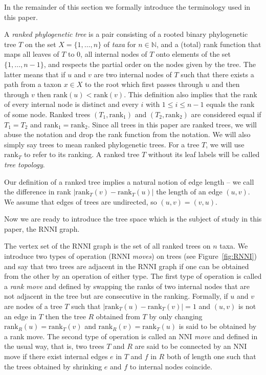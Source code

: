 \documentclass{amsart}
\newcommand{\rank}{\mathrm{rank}}
\newcommand{\nni}{\mathrm{NNI}}
\newcommand{\rnni}{\mathrm{RNNI}}
\begin{document}
In the remainder of this section we formally introduce the terminology used in this paper.

A \emph{ranked phylogenetic tree} is a pair consisting of a rooted binary phylogenetic tree $T$ on the set $X = \{1, \ldots, n\}$ of \emph{taxa} for $n \in \mathbb N$, and a (total) rank function that maps all leaves of $T$ to $0$, all internal nodes of $T$ onto elements of the set $\{1, \ldots, n-1\}$, and respects the partial order on the nodes given by the tree.
The latter means that if $u$ and $v$ are two internal nodes of $T$ such that there exists a path from a taxon $x \in X$ to the root which first passes through $u$ and then through $v$ then $\rank(u) < \rank(v)$.
This definition also implies that the rank of every internal node is distinct and every $i$ with $1 \leq i \leq n-1$ equals the rank of some node.
Ranked trees $(T_1, \rank_1)$ and $(T_2, \rank_2)$ are considered equal if $T_1 = T_2$ and $\rank_1 = \rank_2$.
Since all trees in this paper are ranked trees, we will abuse the notation and drop the rank function from the notation.
We will also simply say trees to mean ranked phylogenetic trees.
For a tree $T$, we will use $\rank_T$ to refer to its ranking.
A ranked tree $T$ without its leaf labels will be called \emph{tree topology}.

Our definition of a ranked tree implies a natural notion of edge length -- we call the difference in rank $|\rank_T(v) - \rank_T(u)|$ the length of an edge $(u, v)$.
We assume that edges of trees are undirected, so $(u, v) = (v, u)$.

Now we are ready to introduce the tree space which is the subject of study in this paper, the $\rnni$ graph.

The vertex set of the $\rnni$ graph is the set of all ranked trees on $n$ taxa.
We introduce two types of operation ($\rnni$ \emph{moves}) on trees (see Figure~\ref{fig:RNNI}) and say that two trees are adjacent in the $\rnni$ graph if one can be obtained from the other by an operation of either type.
The first type of operation is called a \emph{rank move} and defined by swapping the ranks of two internal nodes that are not adjacent in the tree but are consecutive in the ranking.
Formally, if $u$ and $v$ are nodes of a tree $T$ such that $|\rank_T(u) - \rank_T(v)| = 1$ and $(u, v)$ is not an edge in $T$ then the tree $R$ obtained from $T$ by only changing $\rank_R(u) = \rank_T(v)$ and $\rank_R(v) = \rank_T(u)$ is said to be obtained by a rank move.
The second type of operation is called an $\nni$ \emph{move} and defined in the usual way, that is, two trees $T$ and $R$ are said to be connected by an $\nni$ move if there exist internal edges $e$ in $T$ and $f$ in $R$ both of length one such that the trees obtained by shrinking $e$ and $f$ to internal nodes coincide.
\end{document}
